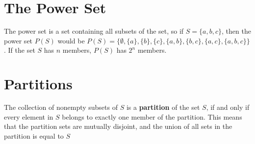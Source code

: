 \section*{The Power Set}

The power set is a set containing all subsets of the set, so if $S = \{a, b, c\}$, then the power set $P(S)$ would be
 $P(S) = \{\emptyset, \{a\}, \{b\}, \{c\}, \{a, b\}, \{b, c\}, \{a, c\}, \{a, b, c\}\}$. If the set $S$ has $n$ members,
 $P(S)$ has $2^n$ members.

\section*{Partitions}

The collection of nonempty subsets of $S$ is a \textbf{partition} of the set $S$, if and only if every element in $S$
 belongs to exactly one member of the partition. This means that the partition sets are mutually disjoint, and the union
 of all sets in the partition is equal to $S$